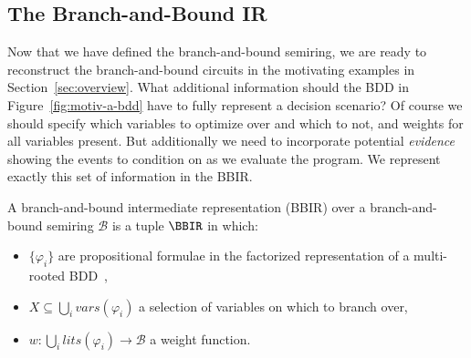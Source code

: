 \subsection{The Branch-and-Bound IR}\label{subsec:msp jsp}
Now that we have defined the branch-and-bound semiring, we are ready
to reconstruct the branch-and-bound circuits in the
motivating examples in Section~\ref{sec:overview}.
What additional information should the BDD in Figure~\ref{fig:motiv-a-bdd} have to fully represent
a decision scenario?
Of course we should specify which variables
to optimize over and which to not, and weights for all variables
present. But additionally we need to incorporate potential \textit{evidence}
showing the events to condition on as we evaluate the program.
We represent exactly this set of information in the BBIR.

\begin{definition}\label{def:bbir}
  A branch-and-bound intermediate representation (BBIR)
  over a branch-and-bound semiring $\mathcal B$
  is a
  tuple $\BBIR$ in which:
  \begin{itemize}
    \item $\{\varphi_i\}$ are propositional formulae
    in the factorized representation of a
    multi-rooted BDD~\citep{darwiche2002knowledge,clarke2018handbook},
    \item $X \subseteq \bigcup_i vars(\varphi_i)$ a selection of variables
    on which to branch over,
    \item $w : \bigcup_i lits(\varphi_i) \to \mathcal B$ a weight function.
  \end{itemize}
\end{definition}





